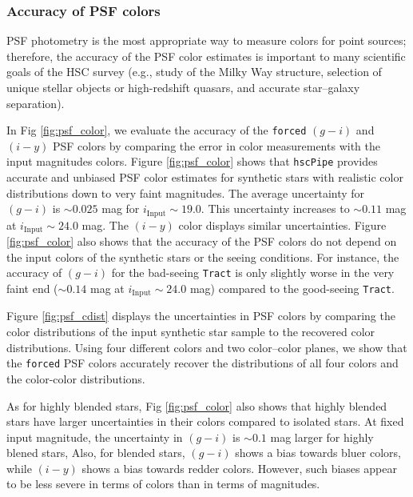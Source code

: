 \documentclass[useamsfonts]{pasj01}
\def\hscpipe{\texttt{hscPipe}}
\def\forced{\texttt{forced}}
\def\tract{\texttt{Tract}}
\begin{document}
\subsubsection{Accuracy of PSF colors}

    PSF photometry is the most appropriate way to measure colors for point
    sources; therefore, the accuracy of the PSF color estimates is important to many 
    scientific goals of the HSC survey
    (e.g., study of the Milky Way structure, selection of unique stellar objects or
    high-redshift quasars, and accurate star--galaxy separation).

    In Fig \ref{fig:psf_color}, we evaluate the accuracy of the \forced{} $(g-i)$
    and $(i-y)$ PSF colors by comparing the error in color measurements with the input magnitudes colors. Figure  \ref{fig:psf_color} shows that \hscpipe{} provides accurate and unbiased PSF color
    estimates for synthetic stars with realistic color distributions down to very 
    faint magnitudes. The average uncertainty for $(g-i)$ is  ${\sim}0.025$ mag for $i_{\mathrm{Input}}{\sim}19.0$. This uncertainty increases to ${\sim}0.11$ mag at
    $i_{\mathrm{Input}}{\sim}24.0$ mag.  The $(i-y)$ color displays similar uncertainties. Figure \ref{fig:psf_color} also shows that the accuracy of the PSF colors do not depend on the input colors of the synthetic stars or the seeing conditions. For instance, the accuracy of $(g-i)$ for the bad-seeing \tract{} is only
    slightly worse in the very faint end (${\sim}0.14$ mag at
    $i_{\mathrm{Input}}{\sim}24.0$ mag) compared to the 
    good-seeing \tract{}.

Figure \ref{fig:psf_cdist} displays the uncertainties in PSF colors  by comparing the color distributions of the input synthetic star sample to the recovered color distributions. Using four different colors and two color--color planes, we show that the 
    \forced{} PSF colors accurately recover the distributions of all four colors 
    and the color-color distributions.

    As for highly blended stars, Fig \ref{fig:psf_color} also shows that highly blended stars have larger uncertainties in their colors compared to isolated stars. At fixed input magnitude, the  uncertainty in $(g-i)$ is ${\sim}0.1$ mag larger for highly blened stars, Also, for blended stars, $(g-i)$ shows a bias towards bluer colors, while $(i-y)$ shows a bias towards redder colors. However, such biases appear to be less severe in terms of colors than in terms of magnitudes.
    
\end{document}
